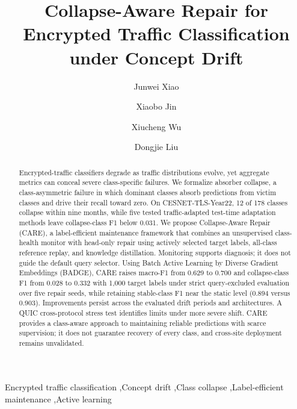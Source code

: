 \documentclass[preprint,12pt,authoryear]{elsarticle}
\begin{document}
\begin{frontmatter}

\title{Collapse-Aware Repair for Encrypted Traffic Classification under Concept Drift}

\author[a]{Junwei Xiao}
\author[b]{Xiaobo Jin}
\author[c]{Xiucheng Wu}
\author[a]{Dongjie Liu}
\address[a]{College of Cyber Security, Jinan University, No. 855 Xingye Avenue East, Panyu District, Guangzhou, Guangdong 511443, China}
\address[b]{Department of Intelligent Science, School of Advanced Technology, Xi'an Jiaotong-Liverpool University, 111 Ren'ai Road, Suzhou Dushu Lake Science and Education Innovation District, Suzhou Industrial Park, Suzhou, Jiangsu 215123, P.R. China}
\address[c]{Coremail, Floors 7--10, Building 3, Chuangzhi Tower, No. 28 Qinglan Street, Guangzhou Higher Education Mega Center, Guangzhou, Guangdong 510006, China}

\begin{abstract}
Encrypted-traffic classifiers degrade as traffic distributions evolve, yet aggregate metrics can conceal severe class-specific failures. We formalize absorber collapse, a class-asymmetric failure in which dominant classes absorb predictions from victim classes and drive their recall toward zero. On CESNET-TLS-Year22, 12 of 178 classes collapse within nine months, while five tested traffic-adapted test-time adaptation methods leave collapse-class F1 below 0.031. We propose Collapse-Aware Repair (CARE), a label-efficient maintenance framework that combines an unsupervised class-health monitor with head-only repair using actively selected target labels, all-class reference replay, and knowledge distillation. Monitoring supports diagnosis; it does not guide the default query selector. Using Batch Active Learning by Diverse Gradient Embeddings (BADGE), CARE raises macro-F1 from 0.629 to 0.700 and collapse-class F1 from 0.028 to 0.332 with 1{,}000 target labels under strict query-excluded evaluation over five repair seeds, while retaining stable-class F1 near the static level (0.894 versus 0.903). Improvements persist across the evaluated drift periods and architectures. A QUIC cross-protocol stress test identifies limits under more severe shift. CARE provides a class-aware approach to maintaining reliable predictions with scarce supervision; it does not guarantee recovery of every class, and cross-site deployment remains unvalidated.
\end{abstract}

\begin{keyword}
Encrypted traffic classification \sep Concept drift \sep Class collapse \sep Label-efficient maintenance \sep Active learning
\end{keyword}

\end{frontmatter}
\end{document}

